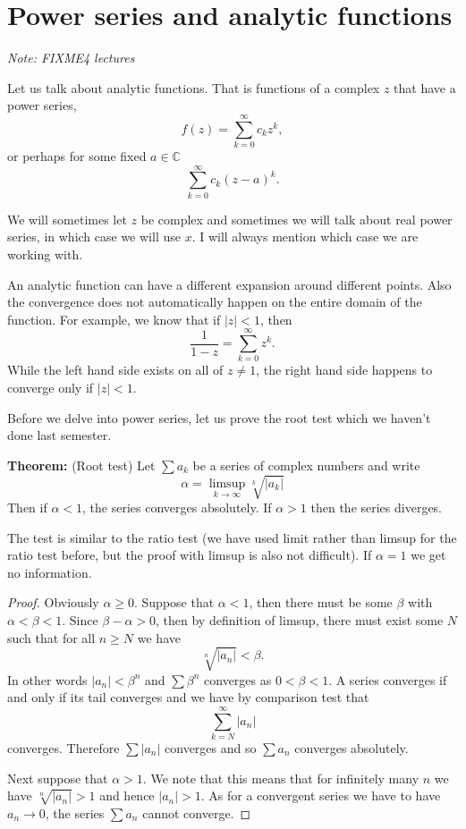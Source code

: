 \documentclass[12pt]{book}
\newcommand{\abs}[1]{\left\lvert {#1} \right\rvert}
\newcommand{\C}{{\mathbb{C}}}
\newcommand{\sectionnotes}[1]{\noindent \emph{Note: #1} \medskip \par}
\newcommand{\sectionnewpage}{\clearpage}
\theoremstyle{plain}
\theoremstyle{remark}
\theoremstyle{definition}
\theoremstyle{exercise}
\theoremstyle{example}
\begin{document}

\sectionnewpage
\section{Power series and analytic functions}
\label{sec:FIXME}

\sectionnotes{FIXME4 lectures}

Let us talk about analytic functions.  That is functions of a complex $z$ that have a power
series,
$$
f(z) = \sum_{k=0}^\infty c_k z^k ,
$$
or perhaps for some fixed $a \in \C$
$$
\sum_{k=0}^\infty c_k {(z-a)}^k .
$$

We will sometimes let $z$ be complex and sometimes we will talk about real
power series, in which case we will use $x$.  I will always mention which
case we are working with.

An analytic function can have a different expansion around different
points.  Also the convergence does not automatically happen on the entire
domain of the function.  For example, we know that if $\abs{z} < 1$, then
\begin{equation*}
\frac{1}{1-z} = \sum_{k=0}^\infty z^k .
\end{equation*}
While the left hand side exists on all of $z \not= 1$, the right hand side
happens to converge only if $\abs{z} < 1$.

\medskip

Before we delve into power series, let us prove the root test which we
haven't done last semester.

\medskip

\textbf{Theorem:} (Root test)
Let $\sum a_k$ be a series of complex numbers and write
\begin{equation*}
\alpha = \limsup_{k\to\infty} \sqrt[k]{\abs{a_k}}
\end{equation*}
Then if $\alpha < 1$, the series converges absolutely.  If $\alpha > 1$ then 
the series diverges.

\medskip

The test is similar to the ratio test (we have used limit rather than limsup
for the ratio test before, but the proof with limsup is also not difficult).
If $\alpha = 1$ we get no information.

\begin{proof}
Obviously $\alpha \geq 0$.
Suppose that $\alpha < 1$, then there must be some $\beta$ with $\alpha <
\beta < 1$.  Since $\beta - \alpha > 0$, then by definition of limsup,
there must exist some $N$ such that
for all $n \geq N$ we have
$$
\sqrt[n]{\abs{a_n}} < \beta .
$$
In other words
$\abs{a_n} < \beta^n$ and
$\sum \beta^n$ converges as $0 < \beta < 1$.
A series converges if and only if its tail converges and we have by
comparison test that
$$
\sum_{k=N}^\infty \abs{a_n}
$$
converges.  Therefore $\sum \abs{a_n}$ converges and so $\sum a_n$ converges
absolutely.

Next suppose that $\alpha > 1$.  We note that this means that for infinitely
many $n$ we have
$\sqrt[n]{\abs{a_n}} > 1$ and hence
$\abs{a_n} > 1$.  As for a convergent series we have to have
$a_n \to 0$, the series
$\sum a_n$ cannot converge.
\end{proof}
\end{document}
